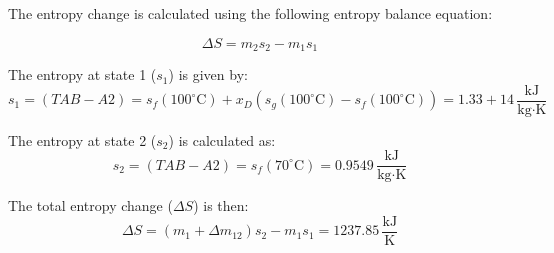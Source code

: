 The entropy change is calculated using the following entropy balance equation:  

\[
\Delta S = m_2 s_2 - m_1 s_1
\]

The entropy at state 1 (\(s_1\)) is given by:  
\[
s_1 = (TAB-A2) = s_f(100^\circ\text{C}) + x_D \left(s_g(100^\circ\text{C}) - s_f(100^\circ\text{C})\right) = 1.33 + 14 \, \frac{\text{kJ}}{\text{kg·K}}
\]

The entropy at state 2 (\(s_2\)) is calculated as:  
\[
s_2 = (TAB-A2) = s_f(70^\circ\text{C}) = 0.9549 \, \frac{\text{kJ}}{\text{kg·K}}
\]

The total entropy change (\(\Delta S\)) is then:  
\[
\Delta S = \left(m_1 + \Delta m_{12}\right) s_2 - m_1 s_1 = 1237.85 \, \frac{\text{kJ}}{\text{K}}
\]